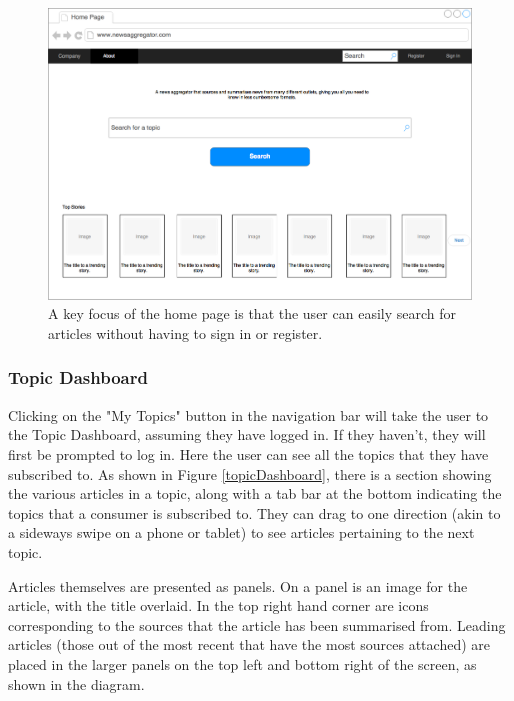 \documentclass[12pt]{article}
\begin{document}
\label{homepage}

\begin{figure}[ht!]
  \centering
    \includegraphics[scale=0.3]{HomePage.png}
   \caption[A wireframe of the Home Screen]{A key focus of the home page is that the user can easily search for articles without having to sign in or register.}
   \label{homePage}
\end{figure}

\subsubsection{Topic Dashboard}

Clicking on the "My Topics" button in the navigation bar will take the user to the Topic Dashboard, assuming they have logged in. If they haven't, they will first be prompted to log in. Here the user can see all the topics that they have subscribed to. As shown in Figure \ref{topicDashboard}, there is a section showing the various articles in a topic, along with a tab bar at the bottom indicating the topics that a consumer is subscribed to. They can drag to one direction (akin to a sideways swipe on a phone or tablet) to see articles pertaining to the next topic. 

Articles themselves are presented as panels. On a panel is an image for the article, with the title overlaid. In the top right hand corner are icons corresponding to the sources that the article has been summarised from. Leading articles (those out of the most recent that have the most sources attached) are placed in the larger panels on the top left and bottom right of the screen, as shown in the diagram.
\end{document}
